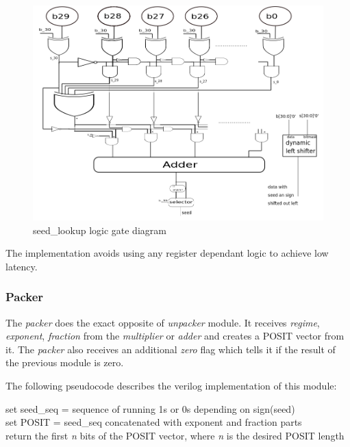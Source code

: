 \documentclass[10pt]{article}
\begin{document}
\begin{figure}[h]
  \centering
  \includegraphics[width=.8\textwidth,height=0.3\paperheight]{seed_lookup}
  \caption{seed\_lookup logic gate diagram}
  \label{fig:seed_lookup_diagram}
\end{figure}

The implementation avoids using any register dependant logic to achieve low
latency.

\subsubsection{Packer}\label{sec:packer}

The \textit{packer} does the exact opposite of \textit{unpacker} module. It
receives \textit{regime}, \textit{exponent}, \textit{fraction} from the
\textit{multiplier} or \textit{adder} and creates a POSIT vector from it.
The \textit{packer} also receives an additional \textit{zero} flag which tells
it if the result of the previous module is zero.

The following pseudocode describes the verilog implementation of this module:\\

\begin{algorithm}[H]
  {
   set seed\_seq = sequence of running 1s or 0s depending on sign(seed) \\
   set POSIT = seed\_seq concatenated with exponent and fraction parts \\
   return the first \textit{n} bits of the POSIT vector, where \textit{n} is the
   desired POSIT length
 }
\end{algorithm}
\end{document}
